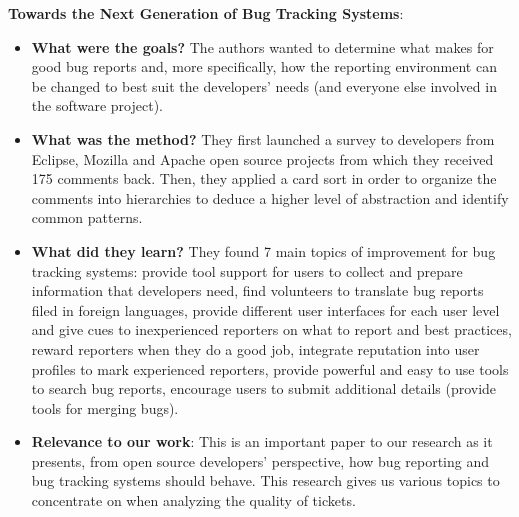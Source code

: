 \documentclass{mprop}
\begin{document}
\textbf{Towards the Next Generation of Bug Tracking Systems}\cite{just2008towards}:
\begin{itemize}
  \item \textbf{What were the goals?}
  The authors wanted to determine what makes for good bug reports and, more specifically, how the reporting environment can be changed to best suit the developers’ needs (and everyone else involved in the software project). 
  \item \textbf{What was the method?}
  They first launched a survey to developers from Eclipse, Mozilla and Apache open source projects from which they received 175 comments back. Then, they applied a card sort in order to organize the comments into hierarchies to deduce a higher level of abstraction and identify common patterns. 
  \item \textbf{What did they learn?}
  They found 7 main topics of improvement for bug tracking systems: provide tool support for users to collect and prepare information that developers need, find volunteers to translate bug reports filed in foreign languages, provide different user interfaces for each user level and give cues to inexperienced reporters on what to report and best practices, reward reporters when they do a good job, integrate reputation into user profiles to mark experienced reporters, provide powerful and easy to use tools to search bug reports, encourage users to submit additional details (provide tools for merging bugs). 
  \item \textbf{Relevance to our work}:
  This is an important paper to our research as it presents, from open source developers’ perspective, how bug reporting and bug tracking systems should behave. This research gives us various topics to concentrate on when analyzing the quality of tickets. 
\end{itemize}
\end{document}
